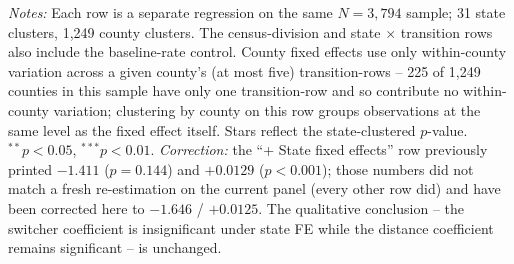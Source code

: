 \documentclass[preprint,12pt,authoryear]{elsarticle}
\begin{document}
\begin{table}[htbp]
\centering
\caption{Robustness of main coefficients to fixed-effects controls}
\label{tab:fe}
\vspace{2pt}
\begin{minipage}{0.95\textwidth}
\footnotesize\emph{Notes:} Each row is a separate regression on the
same $N=3{,}794$ sample; 31 state clusters, 1{,}249 county clusters.
The census-division and state $\times$ transition rows also include
the baseline-rate control. County fixed effects use only
within-county variation across a given county's (at most five)
transition-rows -- 225 of 1,249 counties in this sample have only one
transition-row and so contribute no within-county variation; clustering
by county on this row groups observations at the same level as the
fixed effect itself. Stars reflect the state-clustered $p$-value.
$^{**}p<0.05$, $^{***}p<0.01$. \emph{Correction:} the ``+ State fixed
effects'' row previously printed $-1.411$ ($p{=}0.144$) and $+0.0129$
($p{<}0.001$); those numbers did not match a fresh re-estimation on
the current panel (every other row did) and have been corrected here
to $-1.646$ / $+0.0125$. The qualitative conclusion --  the switcher
coefficient is insignificant under state FE while the distance
coefficient remains significant -- is unchanged.
\end{minipage}
\end{table}
\end{document}
